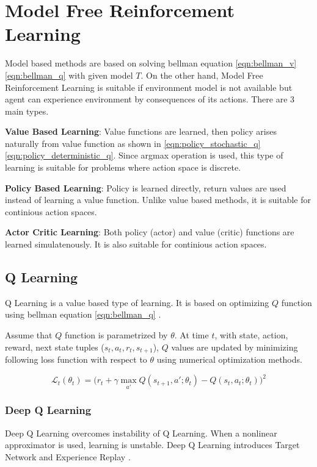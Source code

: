 \section{Model Free Reinforcement Learning}
\label{sec:mf_rl}

Model based methods are based on solving bellman equation \ref{eqn:bellman_v}\ref{eqn:bellman_q} with given model $T$. On the other hand, Model Free Reinforcement Learning is suitable if environment model is not available but agent can experience environment by consequences of its actions. There are 3 main types.

\textbf{Value Based Learning}: Value functions are learned, then policy arises naturally from value function as shown in \ref{eqn:policy_stochastic_q} \ref{eqn:policy_deterministic_q}. Since argmax operation is used, this type of learning is suitable for problems where action space is discrete.

\textbf{Policy Based Learning}: Policy is learned directly, return values are used instead of learning a value function. Unlike value based methods, it is suitable for continious action spaces.

\textbf{Actor Critic Learning}: Both policy (actor) and value (critic) functions are learned simulatenously. It is also suitable for continious action spaces. 

\subsection{Q Learning}
Q Learning is a value based type of learning. It is based on optimizing $Q$ function using bellman equation \ref{eqn:bellman_q} \cite{watkins_technical_1992}. 

Assume that $Q$ function is parametrized by $\theta$. At time $t$,  with state, action, reward, next state tuples ($s_t,a_t,r_t,s_{t+1}$), $Q$ values are updated by minimizing following loss function with respect to $\theta$ using numerical optimization methods.

\begin{equation}
\label{eqn:q_loss}
\mathcal{L}_t(\theta_t) = \big( r_t + \gamma \max_{a'} Q(s_{t+1},a';\theta_t) - Q(s_t,a_t;\theta_t) \big) ^ 2
\end{equation}

\subsubsection{Deep Q Learning}

Deep Q Learning overcomes instability of Q Learning. When a nonlinear approximator is used, learning is unstable. Deep Q Learning introduces Target Network and Experience Replay \cite{mnih_human-level_2015}.

